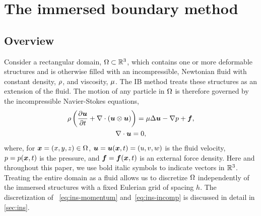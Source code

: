 \section{The immersed boundary method}\label{sec:ib}

\subsection{Overview}\label{sec:ib_old}

Consider a rectangular domain, $\Omega\subset\mathbb{R}^3$, which contains one or more deformable structures and is
otherwise filled with an incompressible, Newtonian fluid with constant density, $\rho$, and viscosity,
$\mu$. The IB method treats these structures as an extension of the fluid. The motion of any particle in
$\Omega$ is therefore governed by the incompressible Navier-Stokes equations,
\begin{gather}
    \density\left(\frac{\partial\u}{\partial t} + \div(\u\otimes\u)\right) = \viscosity\laplacian \u - \grad p + \f, \label{eq:ins-momentum} \\
    \div \u = 0, \label{eq:ins-incomp}
\end{gather}
where, for $\boldsymbol{x} = (x, y, z) \in \Omega$, $\boldsymbol{u} = \boldsymbol{u}(\boldsymbol{x}, t) = (u, v, w)$ is the fluid velocity, $p = p(\boldsymbol{x}, t)$ is the
pressure, and $\boldsymbol{f} = \boldsymbol{f}(\boldsymbol{x}, t)$ is an external force density. Here and throughout this paper, we use bold italic
symbols to indicate vectors in $\mathbb{R}^3$. Treating the entire domain as a fluid allows us to discretize $\Omega$
independently of the immersed structures with a fixed Eulerian grid of spacing $h$. The discretization of~%
\eqref{eq:ins-momentum} and~\eqref{eq:ins-incomp} is discussed in detail in \cref{sec:ins}.

